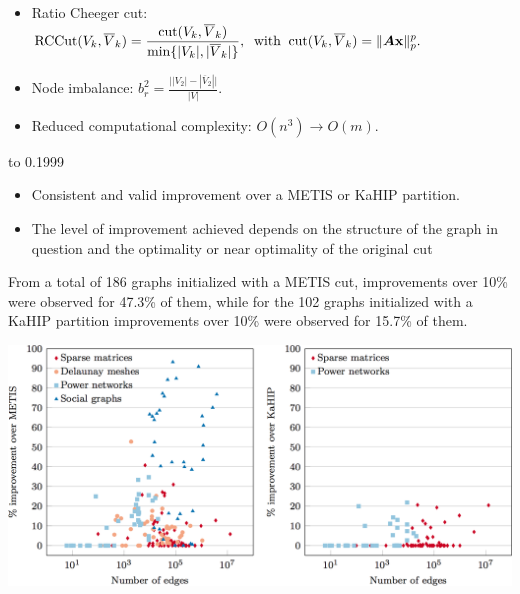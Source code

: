 \documentclass[12pt]{article}
\begin{document}
{{\begin{multicols}{2}
{\begin{itemize}
\item Ratio Cheeger cut: $ \displaystyle
\text{RCCut}(V_k,\overline{V}_k) = \frac{\text{cut}(V_k,\overline{V}_k)}{\min\{|V_k|,|\overline{V}_k|\}}, \;\; \text{with} \;\; \text{cut}(V_k,\overline{V}_k) = \|\boldsymbol{A}{\bf x}\|_p^p.
$
\item Node imbalance: $ \displaystyle
b_r^2 = 
\frac{ \big |  |V_2| - |\overline{V}_2| \big|}{|V|}.
$
\item Reduced computational complexity: $\displaystyle O(n^3) \rightarrow O(m)$. 
\end{itemize}





} %


 \columnbreak


\newpart{\color{white}{ Particle Simulations Integrated with OpenACC}}
\vbox to 0.1999\textheight
{
  \raggedcolumns
  \setlength{\columnseprule}{0.pt}
  
\vspace{+0.5cm}

\begin{itemize}
    \item Consistent and valid improvement over a METIS or KaHIP partition.
    \item The level of improvement achieved depends on the structure of the graph in question and the optimality or near optimality of the original cut
\end{itemize}
 From a total of 186 graphs initialized with a METIS cut, improvements over 10\% were observed for 47.3\% of them, while for the 102 graphs initialized with a KaHIP partition improvements over 10\% were observed for 15.7\% of them.

% 

% 

\centering
\vspace{+0.9cm}
\includegraphics[width=0.96\columnwidth]{figures/concentrated_2.png}


 
} %


\end{multicols}
   } %

} %
\end{document}
